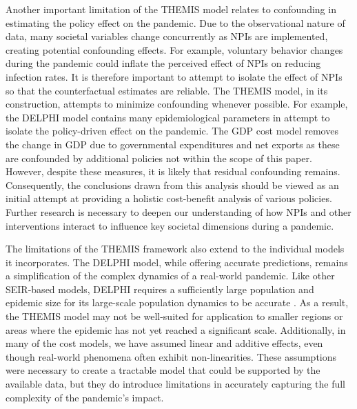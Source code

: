 \documentclass[msom,blindrev]{informs3} %
\begin{document}
Another important limitation of the THEMIS model relates to confounding in estimating the policy effect on the pandemic. Due to the observational nature of data, many societal variables change concurrently as NPIs are implemented, creating potential confounding effects. For example, voluntary behavior changes during the pandemic could inflate the perceived effect of NPIs on reducing infection rates. It is therefore important to attempt to isolate the effect of NPIs so that the counterfactual estimates are reliable. The THEMIS model, in its construction, attempts to minimize confounding whenever possible. For example, the DELPHI model contains many epidemiological parameters in attempt to isolate the policy-driven effect on the pandemic. The GDP cost model removes the change in GDP due to governmental expenditures and net exports as these are confounded by additional policies not within the scope of this paper. However, despite these measures, it is likely that residual confounding remains. Consequently, the conclusions drawn from this analysis should be viewed as an initial attempt at providing a holistic cost-benefit analysis of various policies. Further research is necessary to deepen our understanding of how NPIs and other interventions interact to influence key societal dimensions during a pandemic.

The limitations of the THEMIS framework also extend to the individual models it incorporates. The DELPHI model, while offering accurate predictions, remains a simplification of the complex dynamics of a real-world pandemic. Like other SEIR-based models, DELPHI requires a sufficiently large population and epidemic size for its large-scale population dynamics to be accurate . As a result, the THEMIS model may not be well-suited for application to smaller regions or areas where the epidemic has not yet reached a significant scale. Additionally, in many of the cost models, we have assumed linear and additive effects, even though real-world phenomena often exhibit non-linearities. These assumptions were necessary to create a tractable model that could be supported by the available data, but they do introduce limitations in accurately capturing the full complexity of the pandemic's impact.
\end{document}
